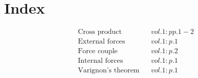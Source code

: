 \documentclass[a4paper]{article}
\begin{document}
 
\section*{Index} 
\begin{align*} 
&\text{Cross product}&& vol. 1: pp. 1-2\\
&\text{External forces}&& vol. 1: p. 1\\
&\text{Force couple}&& vol. 1: p. 2\\
&\text{Internal forces}&& vol. 1: p. 1\\
&\text{Varignon's theorem}&& vol. 1: p. 1\\
\end{align*} 
\end{document}
